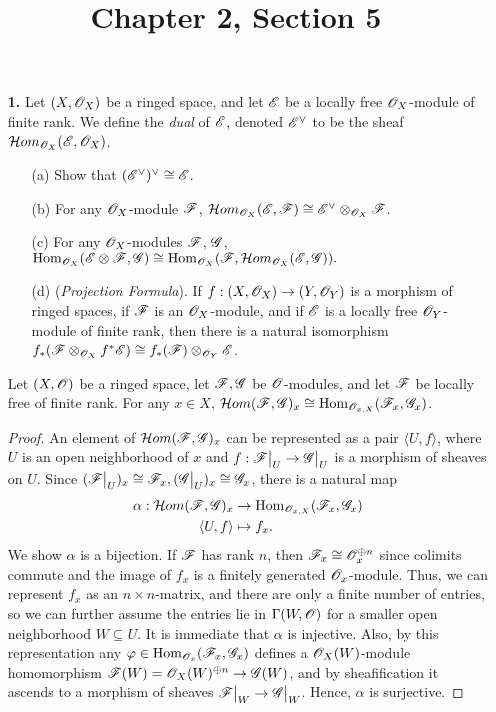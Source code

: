 \documentclass{article}
\title{Chapter 2, Section 5}
\begin{document}
\maketitle
\begin{enumerate} [label=\textbf{\arabic*.}, leftmargin=0em]

\item[\textbf{1.}] Let $(X, \mathscr{O}_X)$ be a ringed space, and let $\mathscr{E}$ be a locally free $\mathscr{O}_X$-module of finite rank. We define the \textit{dual} of $\mathscr{E}$, denoted $\mathscr{E}^\vee$ to be the sheaf $\mathcal{H}om_{\mathscr{O}_X}(\mathscr{E}, \mathscr{O}_X)$.
\begin{itemize}
    \item[(a)] Show that $(\mathscr{E}^\vee)^\vee \cong \mathscr{E}$.
    \item[(b)] For any $\mathscr{O}_X$-module $\mathscr{F}$, $\mathcal{H}om_{\mathscr{O}_X}(\mathscr{E}, \mathscr{F}) \cong \mathscr{E}^\vee \otimes_{\mathscr{O}_X} \mathscr{F}$.
    \item[(c)] For any $\mathscr{O}_X$-modules $\mathscr{F}$, $\mathscr{G}$, $\operatorname{Hom}_{\mathscr{O}_X}(\mathscr{E} \otimes \mathscr{F}, \mathscr{G}) \cong \operatorname{Hom}_{\mathscr{O}_X}(\mathscr{F}, \mathcal{H}om_{\mathscr{O}_X}(\mathscr{E}, \mathscr{G})).$
    \item[(d)] (\textit{Projection Formula}). If $f : (X, \mathscr{O}_X) \to (Y, \mathscr{O}_Y)$ is a morphism of ringed spaces, if $\mathscr{F}$ is an $\mathscr{O}_X$-module, and if $\mathscr{E}$ is a locally free $\mathscr{O}_Y$-module of finite rank, then there is a natural isomorphism $f_*(\mathscr{F} \otimes_{\mathscr{O}_X} f^* \mathscr{E}) \cong f_*(\mathscr{F}) \otimes_{\mathscr{O}_Y} \mathscr{E}$.
\end{itemize}

\begin{lemma}
    Let $(X, \mathscr{O})$ be a ringed space, let $\mathscr{F}, \mathscr{G}$ be $\mathscr{O}$-modules, and let $\mathscr{F}$ be locally free of finite rank. For any $x \in X$, $\mathcal{H}om(\mathscr{F}, \mathscr{G})_x \cong \operatorname{Hom}_{\mathscr{O}_{x, X}}(\mathscr{F}_x, \mathscr{G}_x)$.
\end{lemma}

\begin{proof}
    An element of $\mathcal{H}om(\mathscr{F}, \mathscr{G})_x$ can be represented as a pair $\langle U, f \rangle$, where $U$ is an open neighborhood of $x$ and $f : \restr{\fF}{U} \to \restr{\fG}{U}$ is a morphism of sheaves on $U$. Since $(\restr{\fF}{U})_x \cong \fF_x, (\restr{\fG}{U})_x \cong \fG_x$, there is a natural map
    \begin{align*}
        \alpha : \mathcal{H}om(\mathscr{F}, \mathscr{G})_x & \to \operatorname{Hom}_{\mathscr{O}_{x, X}}(\mathscr{F}_x, \mathscr{G}_x) \\
        \langle U, f \rangle & \mapsto f_x.
    \end{align*}
    We show $\alpha$ is a bijection. If $\mathscr{F}$ has rank $n$, then $\mathscr{F}_x \cong \mathscr{O}_{x}^{\oplus n}$ since colimits commute and the image of $f_x$ is a finitely generated $\mathscr{O}_{x}$-module. Thus, we can represent $f_x$ as an $n \times n$-matrix, and there are only a finite number of entries, so we can further assume the entries lie in $\Gamma(W, \mathscr{O})$ for a smaller open neighborhood $W \subseteq U$. It is immediate that $\alpha$ is injective. Also, by this representation any $\varphi \in \operatorname{Hom}_{\mathscr{O}_{x}}(\mathscr{F}_x, \mathscr{G}_x)$ defines a $\mathscr{O}_X(W)$-module homomorphism $\mathscr{F}(W) = \mathscr{O}_{X}(W)^{\oplus n} \to \mathscr{G}(W)$, and by sheafification it ascends to a morphism of sheaves $\restr{\fF}{W} \to \restr{\fG}{W}$. Hence, $\alpha$ is surjective.
\end{proof}


\end{enumerate}
\end{document}
